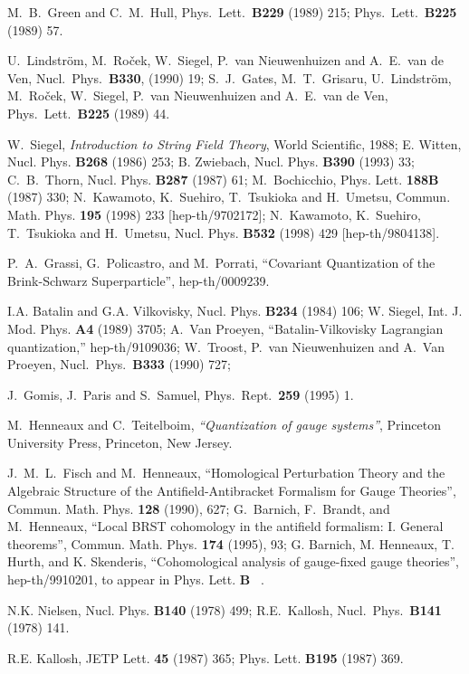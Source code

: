 \documentclass[a4paper,12pt]{article}
\begin{document}
\begin{thebibliography}{999}
  M.~B.~Green and C.~M.~Hull,
  Phys.\ Lett.\  {\bf B229} (1989) 215; 
  Phys.\ Lett.\  {\bf B225} (1989) 57.

  U.~Lindstr\"om, M.~Ro\v cek, W.~Siegel, P.~van Nieuwenhuizen and
  A.~E.~van de Ven, 
  Nucl.\ Phys.\  {\bf B330}, (1990) 19; 
  S.~J.~Gates, M.~T.~Grisaru, U.~Lindstr\"om, M.~Ro\v cek, W.~Siegel, 
  P.~van Nieuwenhuizen and A.~E.~van de Ven,
  Phys.\ Lett.\  {\bf B225} (1989) 44.
 

  W.~Siegel, {\it Introduction to String Field Theory}, World
  Scientific, 1988; 
  E. Witten, Nucl. Phys. {\bf B268} (1986) 253; B. Zwiebach,
  Nucl. Phys. {\bf B390} (1993) 33; C.~B.~Thorn, Nucl. Phys. {\bf
    B287} (1987) 61; M.~Bochicchio, Phys. Lett. {\bf 188B} (1987) 330; 
  N.~Kawamoto, K.~Suehiro, T.~Tsukioka and H.~Umetsu,
  Commun. Math. Phys. {\bf 195} (1998) 233 [hep-th/9702172]; 
  N.~Kawamoto, K.~Suehiro, T.~Tsukioka and H.~Umetsu, Nucl. Phys.
  {\bf B532} (1998) 429 [hep-th/9804138]. 

 


  P.~A.~Grassi, G.~Policastro, and M.~Porrati, ``Covariant 
  Quantization of the Brink-Schwarz Superparticle'', hep-th/0009239.

  I.A. Batalin and G.A. Vilkovisky, Nucl. Phys. {\bf B234} (1984) 106;
  W. Siegel, Int. J. Mod. Phys. {\bf A4} (1989) 3705;
  A.~Van Proeyen, ``Batalin-Vilkovisky Lagrangian quantization,''
  hep-th/9109036; W.~Troost, P.~van Nieuwenhuizen and A.~Van Proeyen,
  Nucl.\ Phys.\ {\bf B333} (1990) 727;

  J.~Gomis, J.~Paris and S.~Samuel,
  Phys.\ Rept.\  {\bf 259}  (1995) 1.

  M.~Henneaux and C.~Teitelboim, {\it ``Quantization of gauge systems''}, 
  Princeton University Press, Princeton, New Jersey. 

  J.~M.~L.~Fisch and M.~Henneaux, ``Homological Perturbation Theory
  and the Algebraic Structure of the Antifield-Antibracket Formalism
  for Gauge Theories'', Commun. Math. Phys. {\bf 128} (1990), 627;
  G.~Barnich, F.~Brandt, and M.~Henneaux, ``Local BRST cohomology in
  the antifield formalism: I. General theorems'',
  Commun. Math. Phys. {\bf 174} (1995), 93; 
  G. Barnich, M. Henneaux, T. Hurth, and K. Skenderis, ``Cohomological
  analysis of gauge-fixed gauge theories'', hep-th/9910201, to appear
  in Phys. Lett. {\bf B} \, .


  N.K. Nielsen, Nucl. Phys. {\bf B140} (1978) 499;
  R.E.~Kallosh, Nucl.\ Phys.\ {\bf B141} (1978) 141.

  R.E. Kallosh, JETP Lett. {\bf 45} (1987) 365; Phys.
  Lett. {\bf B195} (1987) 369.

\end{thebibliography}
\end{document}
